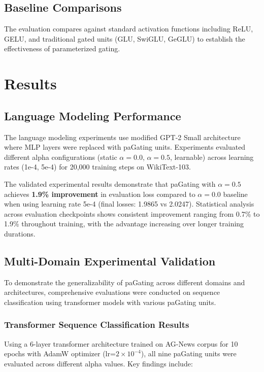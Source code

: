 \documentclass[lettersize,journal]{IEEEtran}
\begin{document}
\subsection{Baseline Comparisons}
The evaluation compares against standard activation functions including ReLU, GELU, and traditional gated units (GLU, SwiGLU, GeGLU) to establish the effectiveness of parameterized gating.

\section{Results}

\subsection{Language Modeling Performance}
The language modeling experiments use modified GPT-2 Small architecture where MLP layers were replaced with paGating units. Experiments evaluated different alpha configurations (static $\alpha=0.0$, $\alpha=0.5$, learnable) across learning rates (1e-4, 5e-4) for 20,000 training steps on WikiText-103.

The validated experimental results demonstrate that paGating with $\alpha=0.5$ achieves \textbf{1.9\% improvement} in evaluation loss compared to $\alpha=0.0$ baseline when using learning rate 5e-4 (final losses: 1.9865 vs 2.0247). Statistical analysis across evaluation checkpoints shows consistent improvement ranging from 0.7\% to 1.9\% throughout training, with the advantage increasing over longer training durations.

\subsection{Multi-Domain Experimental Validation}
\label{sec:multi_domain}

To demonstrate the generalizability of paGating across different domains and architectures, comprehensive evaluations were conducted on sequence classification using transformer models with various paGating units.

\subsubsection{Transformer Sequence Classification Results}

Using a 6-layer transformer architecture trained on AG-News corpus for 10 epochs with AdamW optimizer (lr=$2 \times 10^{-4}$), all nine paGating units were evaluated across different alpha values. Key findings include:
\end{document}
